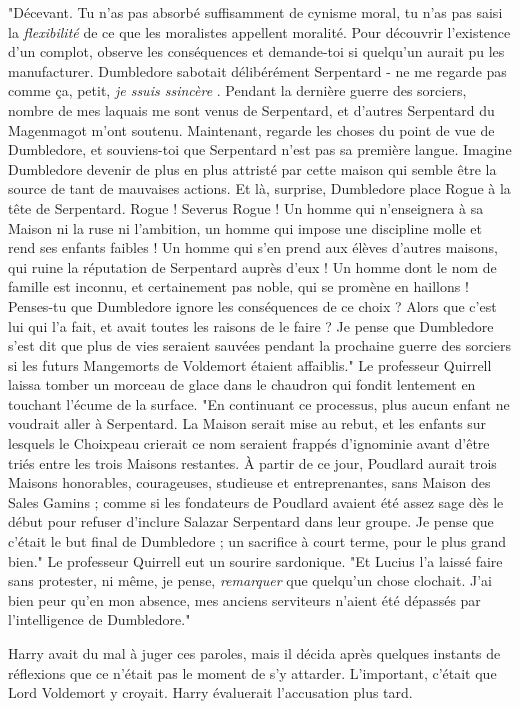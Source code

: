 "Décevant. Tu n'as pas absorbé suffisamment de cynisme moral, tu n'as pas saisi la \emph{flexibilité}  de ce que les moralistes appellent moralité. Pour découvrir l'existence d'un complot, observe les conséquences et demande-toi si quelqu'un aurait pu les manufacturer. Dumbledore sabotait délibérément Serpentard - ne me regarde pas comme ça, petit, \emph{je ssuis ssincère} . Pendant la dernière guerre des sorciers, nombre de mes laquais me sont venus de Serpentard, et d'autres Serpentard du Magenmagot m'ont soutenu. Maintenant, regarde les choses du point de vue de Dumbledore, et souviens-toi que Serpentard n'est pas sa première langue. Imagine Dumbledore devenir de plus en plus attristé par cette maison qui semble être la source de tant de mauvaises actions. Et là, surprise, Dumbledore place Rogue à la tête de Serpentard. Rogue ! Severus Rogue ! Un homme qui n'enseignera à sa Maison ni la ruse ni l'ambition, un homme qui impose une discipline molle et rend ses enfants faibles ! Un homme qui s'en prend aux élèves d'autres maisons, qui ruine la réputation de Serpentard auprès d'eux ! Un homme dont le nom de famille est inconnu, et certainement pas noble, qui se promène en haillons ! Penses-tu que Dumbledore ignore les conséquences de ce choix ? Alors que c'est lui qui l'a fait, et avait toutes les raisons de le faire ? Je pense que Dumbledore s'est dit que plus de vies seraient sauvées pendant la prochaine guerre des sorciers si les futurs Mangemorts de Voldemort étaient affaiblis." Le professeur Quirrell laissa tomber un morceau de glace dans le chaudron qui fondit lentement en touchant l'écume de la surface. "En continuant ce processus, plus aucun enfant ne voudrait aller à Serpentard. La Maison serait mise au rebut, et les enfants sur lesquels le Choixpeau crierait ce nom seraient frappés d'ignominie avant d'être triés entre les trois Maisons restantes. À partir de ce jour, Poudlard aurait trois Maisons honorables, courageuses, studieuse et entreprenantes, sans Maison des Sales Gamins ; comme si les fondateurs de Poudlard avaient été assez sage dès le début pour refuser d'inclure Salazar Serpentard dans leur groupe. Je pense que c'était le but final de Dumbledore ; un sacrifice à court terme, pour le plus grand bien." Le professeur Quirrell eut un sourire sardonique. "Et Lucius l'a laissé faire sans protester, ni même, je pense, \emph{remarquer}  que quelqu'un chose clochait. J'ai bien peur qu'en mon absence, mes anciens serviteurs n'aient été dépassés par l'intelligence de Dumbledore."

Harry avait du mal à juger ces paroles, mais il décida après quelques instants de réflexions que ce n'était pas le moment de s'y attarder. L'important, c'était que Lord Voldemort y croyait. Harry évaluerait l'accusation plus tard.

